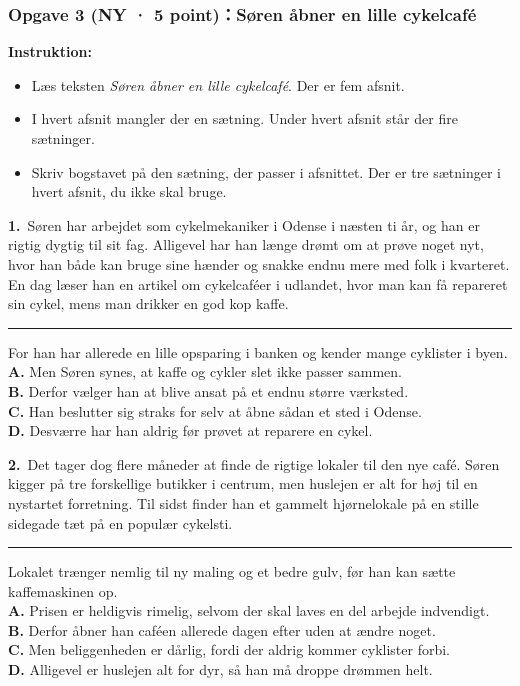 \subsubsection*{Opgave 3 (NY · 5 point)：Søren åbner en lille cykelcafé}

\textbf{Instruktion:}
\begin{itemize}
  \item Læs teksten \textit{Søren åbner en lille cykelcafé}. Der er fem afsnit.
  \item I hvert afsnit mangler der en sætning. Under hvert afsnit står der fire sætninger.
  \item Skriv bogstavet på den sætning, der passer i afsnittet. Der er tre sætninger i hvert afsnit, du ikke skal bruge.
\end{itemize}

\begin{tcolorbox}[enhanced, breakable, colback=NCDBgGray, colframe=NCDNavy!60, boxrule=0.7pt, arc=2pt, left=9pt, right=9pt, top=6pt, bottom=6pt]
\textbf{\color{NCDNavy}1.}\ Søren har arbejdet som cykelmekaniker i Odense i næsten ti år, og han er rigtig dygtig til sit fag. Alligevel har han længe drømt om at prøve noget nyt, hvor han både kan bruge sine hænder og snakke endnu mere med folk i kvarteret. En dag læser han en artikel om cykelcaféer i udlandet, hvor man kan få repareret sin cykel, mens man drikker en god kop kaffe. \rule{2.3cm}{0.4pt} For han har allerede en lille opsparing i banken og kender mange cyklister i byen.\\[4pt]
\textbf{A.} Men Søren synes, at kaffe og cykler slet ikke passer sammen.\\
\textbf{B.} Derfor vælger han at blive ansat på et endnu større værksted.\\
\textbf{C.} Han beslutter sig straks for selv at åbne sådan et sted i Odense.\\
\textbf{D.} Desværre har han aldrig før prøvet at reparere en cykel.
\end{tcolorbox}

\begin{tcolorbox}[enhanced, breakable, colback=NCDBgGray, colframe=NCDNavy!60, boxrule=0.7pt, arc=2pt, left=9pt, right=9pt, top=6pt, bottom=6pt]
\textbf{\color{NCDNavy}2.}\ Det tager dog flere måneder at finde de rigtige lokaler til den nye café. Søren kigger på tre forskellige butikker i centrum, men huslejen er alt for høj til en nystartet forretning. Til sidst finder han et gammelt hjørnelokale på en stille sidegade tæt på en populær cykelsti. \rule{2.3cm}{0.4pt} Lokalet trænger nemlig til ny maling og et bedre gulv, før han kan sætte kaffemaskinen op.\\[4pt]
\textbf{A.} Prisen er heldigvis rimelig, selvom der skal laves en del arbejde indvendigt.\\
\textbf{B.} Derfor åbner han caféen allerede dagen efter uden at ændre noget.\\
\textbf{C.} Men beliggenheden er dårlig, fordi der aldrig kommer cyklister forbi.\\
\textbf{D.} Alligevel er huslejen alt for dyr, så han må droppe drømmen helt.
\end{tcolorbox}

